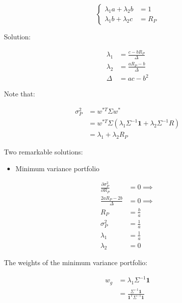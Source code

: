 \documentclass[
  11pt,
]{article}
\providecommand{\tightlist}{%
  \setlength{\itemsep}{0pt}\setlength{\parskip}{0pt}}
\begin{document}
\begin{equation*}
\left\{
                \begin{aligned}
                \lambda_1 a + \lambda_2 b & = 1 \\
                \lambda_1 b + \lambda_2 c & = R_P
                \end{aligned}
              \right.
\end{equation*}

Solution:

\begin{align*}
                \lambda_1 & = \frac{c - b R_P}{\Delta} \\
                \lambda_2 & = \frac{a R_P - b}{\Delta} \\
                \Delta & = ac - b^2
                \end{align*}

Note that:

\begin{align*}
\sigma^2_P & = w^{*T} \Sigma w^* \\
& = w^{*T} \Sigma \left( \lambda_1 \Sigma^{-1} \mathbf{1}+ \lambda_2 \Sigma^{-1} R \right) \\
& = \lambda_1 + \lambda_2 R_P
\end{align*}

Two remarkable solutions:

\begin{itemize}
\tightlist
\item
  Minimum variance portfolio
\end{itemize}

\begin{align*}
\frac{\partial \sigma^2_P}{\partial R_P} & = 0 \implies \\
\frac{2 a R_P - 2b}{\Delta} & = 0 \implies \\
R_P & = \frac{b}{a} \\
\sigma^2_P &= \frac{1}{a} \\
\lambda_1 &=  \frac{1}{a} \\
\lambda_2 &=  0
\end{align*}

The weights of the minimum variance portfolio:

\begin{align*}
w_g & = \lambda_1 \Sigma^{-1} \mathbf{1}\\
& = \frac{\Sigma^{-1} \mathbf{1}}{\mathbf{1}^T\Sigma^{-1} \mathbf{1}}
\end{align*}
\end{document}
